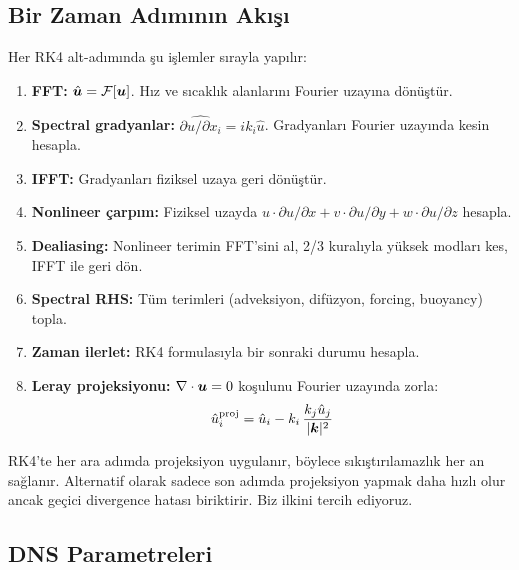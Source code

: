 \subsection{Bir Zaman Adımının Akışı}

Her RK4 alt-adımında şu işlemler sırayla yapılır:

\begin{enumerate}
    \item \textbf{FFT:} $\hat{\bm{u}} = \mathcal{F}[\bm{u}]$. Hız ve sıcaklık alanlarını Fourier uzayına dönüştür.
    \item \textbf{Spectral gradyanlar:} $\widehat{\partial u/\partial x_i} = i k_i \hat{u}$. Gradyanları Fourier uzayında kesin hesapla.
    \item \textbf{IFFT:} Gradyanları fiziksel uzaya geri dönüştür.
    \item \textbf{Nonlineer çarpım:} Fiziksel uzayda $u \cdot \partial u/\partial x + v \cdot \partial u/\partial y + w \cdot \partial u/\partial z$ hesapla.
    \item \textbf{Dealiasing:} Nonlineer terimin FFT'sini al, 2/3 kuralıyla yüksek modları kes, IFFT ile geri dön.
    \item \textbf{Spectral RHS:} Tüm terimleri (adveksiyon, difüzyon, forcing, buoyancy) topla.
    \item \textbf{Zaman ilerlet:} RK4 formulasıyla bir sonraki durumu hesapla.
    \item \textbf{Leray projeksiyonu:} $\nabla \cdot \bm{u} = 0$ koşulunu Fourier uzayında zorla:
    \begin{equation}
        \hat{u}_i^{\text{proj}} = \hat{u}_i - k_i \, \frac{k_j \hat{u}_j}{|\bm{k}|^2}
    \end{equation}
\end{enumerate}

\begin{remark}
RK4'te her ara adımda projeksiyon uygulanır, böylece sıkıştırılamazlık her an sağlanır. Alternatif olarak sadece son adımda projeksiyon yapmak daha hızlı olur ancak geçici divergence hatası biriktirir. Biz ilkini tercih ediyoruz.
\end{remark}

\subsection{DNS Parametreleri}

